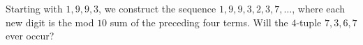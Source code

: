 Starting with $1, 9, 9, 3$, we construct the sequence $1, 9, 9, 3, 2, 3, 7, \ldots$, where each new digit is the mod $10$ sum of the preceding four terms. Will the $4$-tuple $7, 3, 6, 7$ ever occur?
